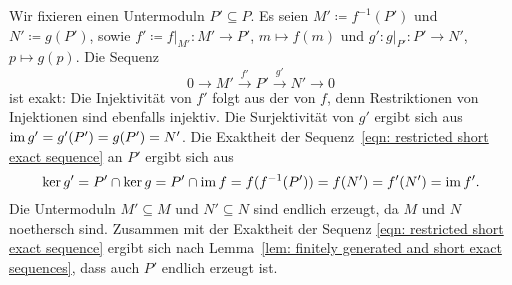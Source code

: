 \documentclass[a4paper,10pt,numbers=noenddot]{scrartcl}
\begin{document}
Wir fixieren einen Untermoduln $P' \subseteq P$.
Es seien $M' \coloneqq f^{-1}(P')$ und $N' \coloneqq g(P')$, sowie $f' \coloneqq f|_{M'} \colon M' \to P'$, $m \mapsto f(m)$ und $g' \colon g|_{P'} \colon P' \to N'$, $p \mapsto g(p)$.
Die Sequenz
\begin{equation}
  \label{eqn: restricted short exact sequence}
  0 \to M' \xrightarrow{f'} P' \xrightarrow{g'} N' \to 0
\end{equation}
ist exakt:
Die Injektivität von $f'$ folgt aus der von $f$, denn Restriktionen von Injektionen sind ebenfalls injektiv.
Die Surjektivität von $g'$ ergibt sich aus $\operatorname{im} g' = g'(P') = g(P') = N'$.
Die Exaktheit der Sequenz~\eqref{eqn: restricted short exact sequence} an $P'$ ergibt sich aus
\[
    \ker g'
  = P' \cap \ker g
  = P' \cap \operatorname{im} f
  = f(f^{-1}(P'))
  = f(N')
  = f'(N')
  = \operatorname{im} f'.
\]
Die Untermoduln $M' \subseteq M$ und $N' \subseteq N$ sind endlich erzeugt, da $M$ und $N$ noethersch sind.
Zusammen mit der Exaktheit der Sequenz \eqref{eqn: restricted short exact sequence} ergibt sich nach Lemma~\ref{lem: finitely generated and short exact sequences}, dass auch $P'$ endlich erzeugt ist.
\end{document}
